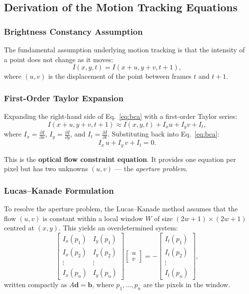 \documentclass[12pt, a4paper]{article}
\begin{document}
\subsection{Derivation of the Motion Tracking Equations}

\subsubsection{Brightness Constancy Assumption}

The fundamental assumption underlying motion tracking is that the intensity of a point does not change as it moves:
\begin{equation}
  I(x, y, t) = I(x + u, y + v, t + 1),
  \label{eq:bca}
\end{equation}
where $(u, v)$ is the displacement of the point between frames $t$ and $t+1$.

\subsubsection{First-Order Taylor Expansion}

Expanding the right-hand side of Eq.~\eqref{eq:bca} with a first-order Taylor series:
\[
  I(x+u, y+v, t+1) \approx I(x,y,t) + I_x u + I_y v + I_t,
\]
where $I_x = \frac{\partial I}{\partial x}$, $I_y = \frac{\partial I}{\partial y}$, and $I_t = \frac{\partial I}{\partial t}$. Substituting back into Eq.~\eqref{eq:bca}:
\begin{equation}
  I_x \, u + I_y \, v + I_t = 0.
  \label{eq:of_constraint}
\end{equation}

This is the \textbf{optical flow constraint equation}. It provides one equation per pixel but has two unknowns $(u, v)$ --- the \emph{aperture problem}.

\subsubsection{Lucas--Kanade Formulation}

To resolve the aperture problem, the Lucas--Kanade method assumes that the flow $(u,v)$ is constant within a local window $W$ of size $(2w+1)\times(2w+1)$ centred at $(x,y)$. This yields an overdetermined system:
\[
  \begin{bmatrix}
    I_x(p_1) & I_y(p_1)\\
    I_x(p_2) & I_y(p_2)\\
    \vdots & \vdots\\
    I_x(p_n) & I_y(p_n)
  \end{bmatrix}
  \begin{bmatrix} u \\ v \end{bmatrix}
  =
  -\begin{bmatrix}
    I_t(p_1)\\
    I_t(p_2)\\
    \vdots\\
    I_t(p_n)
  \end{bmatrix},
\]
written compactly as $A\mathbf{d} = \mathbf{b}$, where $p_1, \ldots, p_n$ are the pixels in the window.
\end{document}
